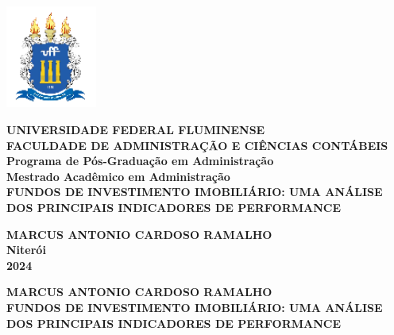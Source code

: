 



\begin{center}
    \includegraphics[angle=0,keepaspectratio,width=3cm]{UFF.png}
    \end{center}
    
    \begin{center}
    \textbf{\fontsize{12}{14}\selectfont 
    UNIVERSIDADE FEDERAL FLUMINENSE\\[0.2cm]
    FACULDADE DE ADMINISTRAÇÃO E CIÊNCIAS CONTÁBEIS\\[0.2cm]
    Programa de Pós-Graduação em Administração\\[0.2cm]
    Mestrado Acadêmico em Administração\\[4.5cm]
    FUNDOS DE INVESTIMENTO IMOBILIÁRIO: UMA ANÁLISE DOS PRINCIPAIS INDICADORES DE PERFORMANCE\\[4cm]
    }
    \end{center}
    
    \begin{center}
    \textbf{MARCUS ANTONIO CARDOSO RAMALHO\\[5.5cm]
    Niterói\\[0.2cm]
    2024
    }
    \end{center}
    \thispagestyle{empty}
    \begin{center}
    
    \textbf{MARCUS ANTONIO CARDOSO RAMALHO\\[1.5cm]
            FUNDOS DE INVESTIMENTO IMOBILIÁRIO: UMA ANÁLISE DOS PRINCIPAIS INDICADORES DE PERFORMANCE\\[5cm]
            }
        
       
        
        \end{center}
    
    
    \begin{quotation}
    \setlength{\leftskip}{7cm}
    \end{quotation}
    
